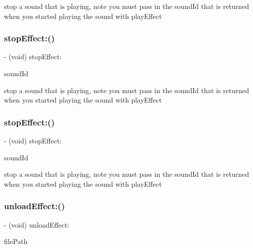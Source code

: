stop a sound that is playing, note you must pass in the sound\+Id that is returned when you started playing the sound with play\+Effect \mbox{\label{interfaceSimpleAudioEngine_a4d818613fe0acb6fa8dc9fac400327f0}} 
\subsubsection{\texorpdfstring{stop\+Effect\+:()}{stopEffect:()}\hspace{0.1cm}{\footnotesize\ttfamily [3/4]}}
{\footnotesize\ttfamily -\/ (void) stop\+Effect\+: \begin{DoxyParamCaption}\item[{(A\+Luint)}]{sound\+Id }\end{DoxyParamCaption}}

stop a sound that is playing, note you must pass in the sound\+Id that is returned when you started playing the sound with play\+Effect \mbox{\label{interfaceSimpleAudioEngine_a4d818613fe0acb6fa8dc9fac400327f0}} 
\subsubsection{\texorpdfstring{stop\+Effect\+:()}{stopEffect:()}\hspace{0.1cm}{\footnotesize\ttfamily [4/4]}}
{\footnotesize\ttfamily -\/ (void) stop\+Effect\+: \begin{DoxyParamCaption}\item[{(A\+Luint)}]{sound\+Id }\end{DoxyParamCaption}}

stop a sound that is playing, note you must pass in the sound\+Id that is returned when you started playing the sound with play\+Effect \mbox{\label{interfaceSimpleAudioEngine_a1f3f121b3664c6b5bcfc33c8af63e52c}} 
\subsubsection{\texorpdfstring{unload\+Effect\+:()}{unloadEffect:()}\hspace{0.1cm}{\footnotesize\ttfamily [1/4]}}
{\footnotesize\ttfamily -\/ (void) unload\+Effect\+: \begin{DoxyParamCaption}\item[{(N\+S\+String $\ast$)}]{file\+Path }\end{DoxyParamCaption}}

